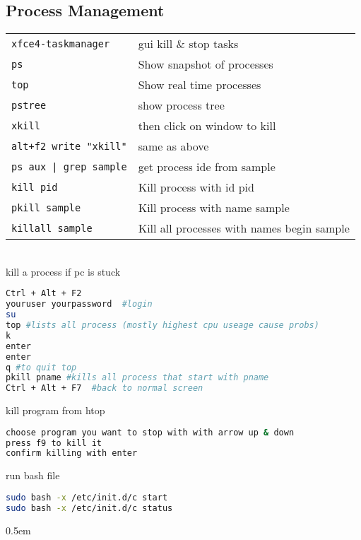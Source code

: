 \documentclass[fontsize=6pt,paper=a4,paper=landscape,twoside=false,parskip=half,
headings=small,numbers=withenddot,usegeometry=true,english]{scrartcl}
\providecommand{\sectionbox}[1]{{\fboxsep0.5em\hspace*{-1.5\fboxsep}%
 \fcolorbox{gray}{gray!3}{%
 \parbox{\columnwidth}{%
 \raggedright #1}}}}
\begin{document}
\begin{multicols}{4}
{	\subsection{Process Management}\label{sec:processmanagement}
	\begin{tabular}{@{}ll@{}}\toprule
		\texttt{xfce4-taskmanager}  &  gui kill \& stop tasks\\
		\texttt{ps}  &  Show snapshot of processes\\
		\texttt{top}  &  Show real time processes\\
		\texttt{pstree}  &  show process tree\\
		\texttt{xkill}  &  then click on window to kill\\
		\texttt{alt+f2 write "xkill"}  &  same as above\\
		\texttt{ps aux | grep sample}  &  get process ide from sample\\
		\texttt{kill pid}  &  Kill process with id pid\\
		\texttt{pkill sample}  &   Kill process with name sample\\
		\texttt{killall sample}  &  Kill all processes with names begin sample\\
		\bottomrule
	\end{tabular}\\
kill a process if pc is stuck\\
\begin{lstlisting}[language=bash]
Ctrl + Alt + F2
youruser yourpassword  #login
su
top #lists all process (mostly highest cpu useage cause probs)
k
enter
enter
q #to quit top
pkill pname #kills all process that start with pname
Ctrl + Alt + F7  #back to normal screen
\end{lstlisting}
kill program from htop\\
\begin{lstlisting}[language=bash]
choose program you want to stop with with arrow up & down
press f9 to kill it
confirm killing with enter
\end{lstlisting}
run bash file\\
\begin{lstlisting}[language=bash]
sudo bash -x /etc/init.d/c start
sudo bash -x /etc/init.d/c status
\end{lstlisting}
}

\sectionbox{
}
\end{multicols}
\end{document}
